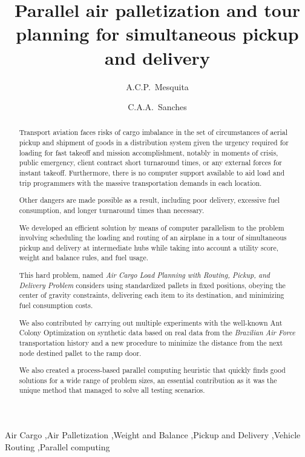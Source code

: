 \documentclass[preprint,authoryear]{elsarticle}
\begin{document}
\begin{frontmatter}

\title{Parallel air palletization and tour planning for simultaneous pickup and delivery}

\author{A.C.P.~Mesquita}

\author{C.A.A.~Sanches}

\address {Instituto Tecnol\'{o}gico de Aeron\'{a}utica - DCTA/ITA/IEC\\
Pra\c{c}a Mal. Eduardo Gomes, 50\\
S\~{a}o Jos\'{e} dos Campos - SP - 12.228-900 - Brazil}


\begin{abstract}

Transport aviation faces risks of cargo imbalance in the set of circumstances of aerial pickup and shipment of goods in a distribution system given the urgency required for loading for fast takeoff and mission accomplishment, notably in moments of crisis, public emergency, client contract short turnaround times, or any external forces for instant takeoff. Furthermore, there is no computer support available to aid load and trip programmers with the massive transportation demands in each location.

Other dangers are made possible as a result, including poor delivery, excessive fuel consumption, and longer turnaround times than necessary.

We developed an efficient solution by means of computer parallelism to the problem involving scheduling the loading and routing of an airplane in a tour of simultaneous pickup and delivery at intermediate hubs while taking into account a utility score, weight and balance rules, and fuel usage.

This hard problem, named {\it Air Cargo Load Planning with Routing, Pickup, and Delivery Problem} considers using standardized pallets in fixed positions, obeying the center of gravity constraints, delivering each item to its destination, and minimizing fuel consumption costs.

We also contributed by carrying out multiple experiments with the well-known Ant Colony Optimization on synthetic data based on real data from the {\it Brazilian Air Force}\/ transportation history and a new procedure to minimize the distance from the next node destined pallet to the ramp door.

We also created a process-based parallel computing heuristic that quickly finds good solutions for a wide range of problem sizes, an essential contribution as { \color{red} it was the unique method that managed to solve all testing scenarios.}

\end{abstract}

\begin{keyword}
Air Cargo \sep Air Palletization \sep Weight and Balance \sep Pickup and Delivery \sep Vehicle Routing \sep Parallel computing
\end{keyword}

\end{frontmatter}
\end{document}
